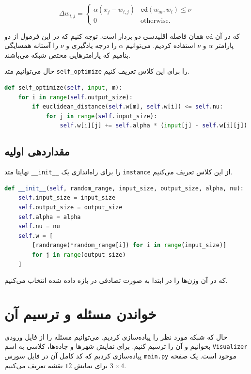 \documentclass[a4paper, 12pt]{article}
\theoremstyle{definition}
\begin{document}
\[ \Delta w_{i,j} = \begin{cases}
        \alpha (x_j - w_{i,j}) & \texttt{ed}(w_m, w_i) \leq \nu \\
        0                      & \text{otherwise}.
    \end{cases}
\]

که در آن
$\texttt{ed}$
همان فاصله اقلیدسی دو بردار است. توجه کنیم که در این فرمول از دو پارامتر
$\alpha$
و
$\nu$
استفاده کردیم. می‌توانیم
$\alpha$
را درجه یادگیری و
$\nu$
را آستانه همسایگی بنامیم که پارامترهایی مختص شبکه می‌باشند.

حال می‌توانیم متد
\texttt{self\_optimize}
را برای این کلاس تعریف کنیم.

\LTR
\begin{lstlisting}[language=Python]
def self_optimize(self, input, m):
    for i in range(self.output_size):
        if euclidean_distance(self.w[m], self.w[i]) <= self.nu:
            for j in range(self.input_size):
                self.w[i][j] += self.alpha * (input[j] - self.w[i][j])
\end{lstlisting}
\RTL

\subsection{مقداردهی اولیه}
نهایتا متد
\texttt{\_\_init\_\_}
را برای راه‌اندازی یک
\texttt{instance}
از این کلاس تعریف می‌کنیم.

\LTR
\begin{lstlisting}[language=Python]
def __init__(self, random_range, input_size, output_size, alpha, nu):
    self.input_size = input_size
    self.output_size = output_size
    self.alpha = alpha
    self.nu = nu
    self.w = [
        [randrange(*random_range[i]) for i in range(input_size)]
        for j in range(output_size)
    ]
\end{lstlisting}
\RTL

که در آن وزن‌ها را در ابتدا به صورت تصادفی در بازه داده شده انتخاب می‌کنیم.

\section{خواندن مسئله و ترسیم آن}

حال که شبکه مورد نظر را پیاده‌سازی کردیم. می‌توانیم مسئله را از فایل ورودی بخوانیم و آن را ترسیم کنیم. برای نمایش شهرها و جاده‌ها، کلاسی به اسم
\texttt{Visualizer}
پیاده‌سازی کردیم که کد کامل آن در فایل سورس
\texttt{main.py}
موجود است. یک صفحه
$3 \times 4$
برای نمایش
$12$
نقشه تعریف می‌کنیم.
\end{document}
